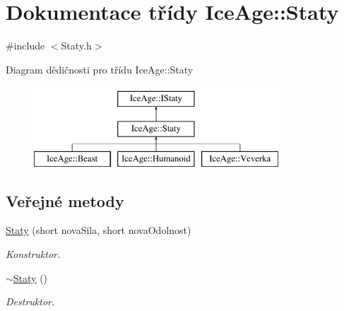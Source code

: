 \hypertarget{classIceAge_1_1Staty}{}\section{Dokumentace třídy Ice\+Age\+:\+:Staty}
\label{classIceAge_1_1Staty}


{\ttfamily \#include $<$Staty.\+h$>$}

Diagram dědičnosti pro třídu Ice\+Age\+:\+:Staty\begin{figure}[H]
\begin{center}
\leavevmode
\includegraphics[height=3.000000cm]{d2/d04/classIceAge_1_1Staty}
\end{center}
\end{figure}
\subsection*{Veřejné metody}
\begin{DoxyCompactItemize}
\item 
\hyperlink{classIceAge_1_1Staty_a41482daadd8eab17ad41eab0233f98e4}{Staty} (short nova\+Sila, short nova\+Odolnost)
\begin{DoxyCompactList}\small\item\em Konstruktor. \end{DoxyCompactList}\item 
\hyperlink{classIceAge_1_1Staty_aa8ccf34e939618fdc60d9ceee5c1309e}{$\sim$\+Staty} ()
\begin{DoxyCompactList}\small\item\em Destruktor. \end{DoxyCompactList}\end{DoxyCompactItemize}
